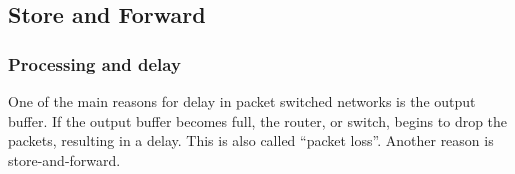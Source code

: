 \subsection{Store and Forward}
\subsubsection{Processing and delay}
One of the main reasons for delay in packet switched networks is the output
buffer. If the output buffer becomes full, the router, or switch, begins to drop
the packets, resulting in a delay. This is also called ``packet loss''. Another
reason is store-and-forward. 